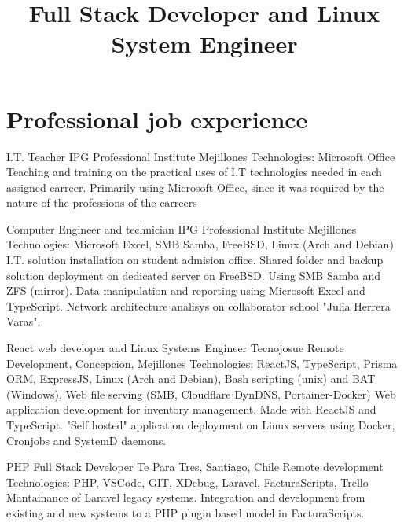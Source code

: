 \documentclass[draft,color,12pt,letterpaper,sans]{moderncv}
\title{Full Stack Developer and Linux System Engineer}
\begin{document}
\makecvtitle %

\section{Professional job experience}

{I.T. Teacher}
{IPG Professional Institute}
{\newline Mejillones}
{\newline Technologies: Microsoft Office}
{Teaching and training on the practical uses of I.T technologies needed in each assigned carreer. Primarily using Microsoft Office, since it was required by the nature of the professions of the carreers \newline}

{Computer Engineer and technician}
{IPG Professional Institute}
{\newline Mejillones}
{\newline Technologies: Microsoft Excel, SMB Samba, FreeBSD, Linux (Arch and Debian)}
{I.T. solution installation on student admision office. \newline Shared folder and backup solution deployment on dedicated server on FreeBSD. Using SMB Samba and ZFS (mirror). \newline Data manipulation and reporting using Microsoft Excel and TypeScript. \newline Network architecture analisys on collaborator school "Julia Herrera Varas". \newline}

{React web developer and Linux Systems Engineer}
{Tecnojosue}
{\newline Remote Development, Concepcion, Mejillones}
{\newline Technologies: ReactJS, TypeScript, Prisma ORM, ExpressJS, Linux (Arch and Debian), Bash scripting (unix) and BAT (Windows), Web file serving (SMB, Cloudflare DynDNS, Portainer-Docker)}
{Web application development for inventory management. Made with ReactJS and TypeScript. \newline "Self hosted" application deployment on Linux servers using Docker, Cronjobs and SystemD daemons. \newline}

{PHP Full Stack Developer}
{Te Para Tres, Santiago, Chile}
{\newline Remote development}
{\newline Technologies: PHP, VSCode, GIT, XDebug, Laravel, FacturaScripts, Trello}
{Mantainance of Laravel legacy systems. Integration and development from existing and new systems to a PHP plugin based model in FacturaScripts.\newline}
\end{document}
